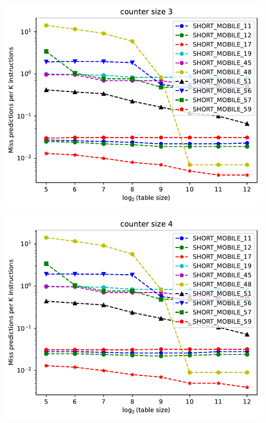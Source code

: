 \documentclass[a4paper]{article}
\begin{document}
\begin{minipage}{.48\linewidth}
\includegraphics[width=\linewidth]{gshare/graph_3}
\end{minipage}%
\hfill
\begin{minipage}{.48\linewidth}
\includegraphics[width=\linewidth]{gshare/graph_4}
\end{minipage}
\end{document}
